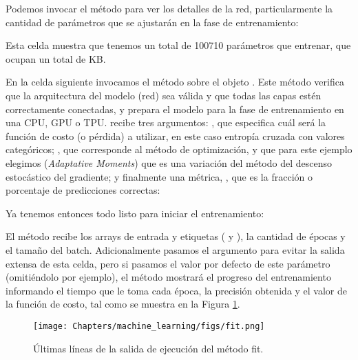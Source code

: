 
Podemos invocar el método  para ver los detalles de la red, particularmente la cantidad de parámetros que se ajustarán en la fase de entrenamiento:


Esta celda muestra que tenemos un total de 100710 parámetros que entrenar, que ocupan un total de  KB. 

En la celda siguiente invocamos el método  sobre el objeto . Este método verifica que la arquitectura del modelo (red) sea válida y que todas las capas estén correctamente conectadas, y prepara el modelo para la fase de entrenamiento en una CPU, GPU o TPU.  recibe tres argumentos: , que especifica cuál será la función de costo (o pérdida) a utilizar, en este caso entropía cruzada con valores categóricos; , que corresponde al método de optimización, y que para este ejemplo elegimos  (\textit{Adaptative Moments}) que es una variación del método del descenso estocástico del gradiente; y finalmente una métrica, , que es la fracción o porcentaje de predicciones correctas:
 

Ya tenemos entonces todo listo para iniciar el entrenamiento:
 

El método  recibe los arrays de entrada y etiquetas ( y ), la cantidad de épocas y el tamaño del batch. Adicionalmente pasamos el argumento  para evitar la salida extensa de esta celda, pero si pasamos el valor por defecto de este parámetro (omitiéndolo por ejemplo), el método mostrará el progreso del entrenamiento informando el tiempo que le toma cada época, la precisión obtenida y el valor de la función de costo, tal como se muestra en la Figura \ref{fig:fit}.

\begin{figure}[t]
\begin{center}
    \texttt{[image: Chapters/machine\_learning/figs/fit.png]}
    \caption{Últimas líneas de la salida de ejecución del método fit.}
    \label{fig:fit}
\end{center}
\end{figure}

